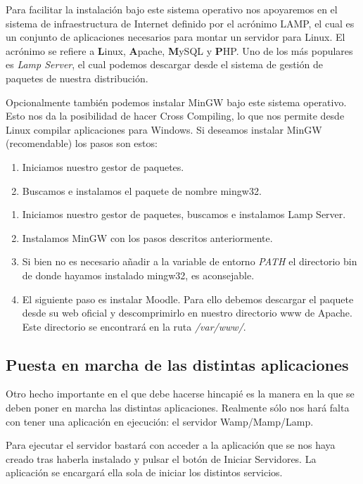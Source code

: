 Para facilitar la instalación bajo este sistema operativo nos apoyaremos en el sistema de infraestructura de Internet definido por el acrónimo LAMP, el cual es un conjunto de aplicaciones necesarios para montar un servidor para Linux. El acrónimo se refiere a \textbf{L}inux, \textbf{A}pache, \textbf{M}ySQL y \textbf{P}HP. Uno de los más populares es \emph{Lamp Server}, el cual podemos descargar desde el sistema de gestión de paquetes de nuestra distribución.

Opcionalmente también podemos instalar MinGW bajo este sistema operativo. Esto nos da la posibilidad de hacer Cross Compiling, lo que nos permite desde Linux compilar aplicaciones para Windows. Si deseamos instalar MinGW (recomendable) los pasos son estos:
	
\begin{enumerate}
	\item Iniciamos nuestro gestor de paquetes.
	\item Buscamos e instalamos el paquete de nombre mingw32.
\end{enumerate}	
	
\begin{enumerate}
	\item Iniciamos nuestro gestor de paquetes, buscamos e instalamos Lamp Server.
	\item Instalamos MinGW con los pasos descritos anteriormente.
	\item Si bien no es necesario añadir a la variable de entorno \emph{PATH} el directorio bin de donde hayamos instalado mingw32, es aconsejable.
	\item El siguiente paso es instalar Moodle. Para ello debemos descargar el paquete desde su web oficial y descomprimirlo en nuestro directorio www de Apache. Este directorio se encontrará en la ruta \emph{/var/www/}.
\end{enumerate}

\subsection{Puesta en marcha de las distintas aplicaciones}

Otro hecho importante en el que debe hacerse hincapié es la manera en la que se deben poner en marcha las distintas aplicaciones. Realmente sólo nos hará falta con tener una aplicación en ejecución: el servidor Wamp/Mamp/Lamp.

Para ejecutar el servidor bastará con acceder a la aplicación que se nos haya creado tras haberla instalado y pulsar el botón de Iniciar Servidores. La aplicación se encargará ella sola de iniciar los distintos servicios.

